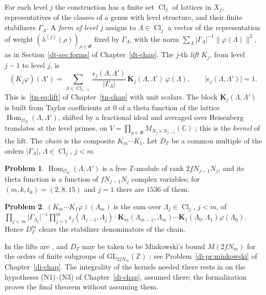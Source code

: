 \documentclass[reqno]{amsart}
\newcounter{chap}
\theoremstyle{definition}
\newtheorem{problem}{Problem}[section]
\theoremstyle{plain}
\theoremstyle{remark}
\newcommand{\Z}{\mathbb Z}
\newcommand{\C}{\mathbb C}
\newcommand{\Oc}{\mathcal O}
\newcommand{\Hom}{\operatorname{Hom}}
\newcommand{\Cl}{\operatorname{Cl}}
\begin{document}
For each level \(j\) the construction has a finite set \(\Cl_j\) of lattices in \(X_j\), representatives of the classes of a genus with level structure, and their finite stabilizers \(\Gamma_\Lambda\).  A \emph{form of level \(j\)} assigns to \(\Lambda\in\Cl_j\) a vector of the representation of weight \((\lambda^{(j)}(\rho))_{\rho\in\Phi}\) fixed by \(\Gamma_\Lambda\), with the norm \(\sum_\Lambda\lvert\Gamma_\Lambda\rvert^{-1}\lVert\varphi(\Lambda)\rVert^2\), as in Section~\ref{dt-sec:forms} of Chapter~\ref{dt-chap}.  The \(j\)-th \emph{lift} \(K_j\), from level \(j-1\) to level \(j\), is
\begin{equation}\label{eq:lift}
 (K_j\varphi)(\Lambda')=\sum_{\Lambda\in\Cl_{j-1}}\frac{\epsilon_j(\Lambda,\Lambda')}{\lvert\Gamma_\Lambda\rvert}\,\mathbf K_j(\Lambda,\Lambda')\,\varphi(\Lambda),\qquad\lvert\epsilon_j(\Lambda,\Lambda')\rvert=1 .
\end{equation}
This is~\eqref{tn-eq:lift} of Chapter~\ref{tn-chap} with unit scalars.  The block \(\mathbf K_j(\Lambda,\Lambda')\) is built from Taylor coefficients at \(0\) of a theta function of the lattice \(\Hom_{\Oc_E}(\Lambda,\Lambda')\), shifted by a fractional ideal and averaged over Heisenberg translates at the level primes, on \(V=\prod_{\rho\in\Phi}M_{N_j\times N_{j-1}}(\C)\) \cite[\S7, Def.~11.10]{Adr}; this is the \emph{kernel} of the lift.  The \emph{chain} is the composite \(K_m\cdots K_1\).  Let \(D_\Gamma\) be a common multiple of the orders \(\lvert\Gamma_\Lambda\rvert\), \(\Lambda\in\Cl_j\), \(j<m\).

\begin{problem}\label{pr:variables}
\(\Hom_{\Oc_E}(\Lambda,\Lambda')\) is a free \(\Z\)-module of rank \(2fN_{j-1}N_j\), and its theta function is a function of \(fN_{j-1}N_j\) complex variables; for \((m,k,t_0)=(2,8,15)\) and \(j=1\) there are \(1536\) of them.
\end{problem}

\begin{problem}\label{pr:chain-kernel}
\((K_m\cdots K_1\varphi)(\Lambda_m)\) is the sum over \(\Lambda_j\in\Cl_j\), \(j<m\), of \(\prod_{j<m}\lvert\Gamma_{\Lambda_j}\rvert^{-1}\prod_{j=1}^m\epsilon_j(\Lambda_{j-1},\Lambda_j)\cdot\mathbf K_m(\Lambda_{m-1},\Lambda_m)\cdots\mathbf K_1(\Lambda_0,\Lambda_1)\varphi(\Lambda_0)\).  Hence \(D_\Gamma^m\) clears the stabilizer denominators of the chain.
\end{problem}

In \cite{Adr} the lifts are \cite[Def.~11.10]{Adr}, and \(D_\Gamma\) may be taken to be Minkowski's bound \(M(2fN_m)\) for the orders of finite subgroups of \(\mathrm{GL}_{2fN_m}(\Z)\) \cite[Prop.~11.14]{Adr}; see Problem~\ref{di-pr:minkowski} of Chapter~\ref{di-chap}.  The integrality of the kernels needed there rests in \cite{Adr} on the hypotheses (N1)--(N3) of Chapter~\ref{di-chap}, assumed there; the formalization proves the final theorem without assuming them.
\end{document}
